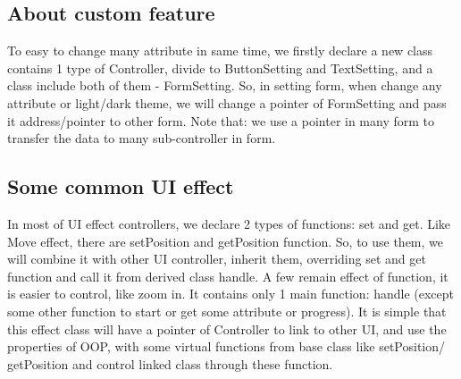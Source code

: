 \subsection{About custom feature}
To easy to change many attribute in same time, we firstly declare a new class contains 1 type of Controller, divide to ButtonSetting and TextSetting, and a class include both of them - FormSetting.
So, in setting form, when change any attribute or light/dark theme, we will change a pointer of FormSetting and pass it address/pointer to other form.
Note that: we use a pointer in many form to transfer the data to many sub-controller in form.
\subsection{Some common UI effect}
In most of UI effect controllers, we declare 2 types of functions: set and get.
Like Move effect, there are setPosition and getPosition function. So, to use them, we will combine it with other UI controller, inherit them, overriding set and get function and call it from derived class handle.
A few remain effect of function, it is easier to control, like zoom in. It contains only 1 main function: handle (except some other function to start or get some attribute or progress).
It is simple that this effect class will have a pointer of Controller to link to other UI, and use the properties of OOP, with some virtual functions from base class like setPosition/ getPosition and control linked class through these function.